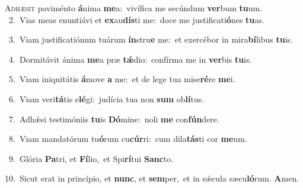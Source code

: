 \lettrine{\initial\textcolor{\initialcolor}{A}}{dhǽsit} paviménto \textbf{á}\-nima \textbf{me}\-a:~\star vivífica me secúndum \textbf{ver}\-bum \textbf{tu}\-um.\\
{\numbfont\textcolor{\numbcolor}{~2.}}~Vias meas enuntiávi et \textbf{ex}\-au\-\textbf{dís}\-ti me:~\star doce me justificati\-\textbf{ó}\-nes \textbf{tu}\-as.\par
{\numbfont\textcolor{\numbcolor}{~3.}}~Viam justificatiónum tuárum \textbf{ín}\-stru\textbf{e} me:~\star et exercébor in mira\-\textbf{bí}\-libus \textbf{tu}\-is.\par
{\numbfont\textcolor{\numbcolor}{~4.}}~Dormitávit ánima \textbf{me}\-a præ \textbf{tǽ}\-dio:~\star confírma me in \textbf{ver}\-bis \textbf{tu}\-is.\par
{\numbfont\textcolor{\numbcolor}{~5.}}~Viam iniquitátis \textbf{á}\-move \textbf{a} me:~\star et de lege tua mise\-\textbf{ré}\-re \textbf{me}\-i.\par
{\numbfont\textcolor{\numbcolor}{~6.}}~Viam veri\-\textbf{tá}\-tis e\-\textbf{lé}\-gi:~\star judícia tua non \textbf{sum} ob\-\textbf{lí}\-tus.\par
{\numbfont\textcolor{\numbcolor}{~7.}}~Adhǽsi testimóniis \textbf{tu}\-is \textbf{Dó}\-mine:~\star noli \textbf{me} con\-\textbf{fún}\-dere.\par
{\numbfont\textcolor{\numbcolor}{~8.}}~Viam mandatórum tu\-\textbf{ó}\-rum cu\-\textbf{cúr}\-ri:~\star cum dila\-\textbf{tás}\-ti cor \textbf{me}\-um.\par
{\numbfont\textcolor{\numbcolor}{~9.}}~Glória \textbf{Pa}\-tri, et \textbf{Fí}\-lio,~\star et Spi\-\textbf{rí}\-tui \textbf{Sanc}\-to.\par
{\numbfont\textcolor{\numbcolor}{10.}}~Sicut erat in princípio, et \textbf{nunc}\-, et \textbf{sem}\-per,~\star et in sǽcula sæcu\-\textbf{ló}\-rum. \textbf{A}\-men.\par
